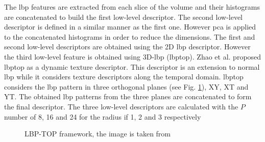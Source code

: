 

The \ac{lbp} features are extracted from each slice of the volume and their histograms are concatenated to build the first low-level descriptor. The second low-level descriptor is defined in a similar manner as the first one. However \ac{pca} is applied to the concatenated histograms in order to reduce the dimensions. The first and second low-level descriptors are obtained using the 2D \ac{lbp} descriptor. However the third low-level feature is obtained using 3D-\ac{lbp} (\ac{lbptop}). Zhao et al. \cite{zhao2007dynamic} proposed \ac{lbptop} as a dynamic texture descriptor. This descriptor is an extension to normal \ac{lbp} while it considers texture descriptors along the temporal domain. \ac{lbptop} considers the \ac{lbp} pattern in three orthogonal planes (see Fig. \ref{fig:LBPTOP-framework}), XY, XT and YT. The obtained \ac{lbp} patterns from the three planes are concatenated to form the final descriptor. The three low-level descriptors are calculated with the $P$ number of 8, 16 and 24 for the radius if 1, 2 and 3 respectively

\begin{figure}
  \caption{LBP-TOP framework, the image is taken from \cite{JiangEtAl13}}
  \label{fig:LBPTOP-framework}
\end{figure}




